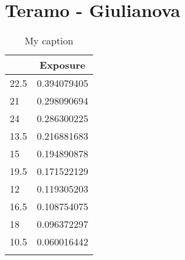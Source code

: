 \section{Teramo - Giulianova}
\begin{table}[H]
	\centering
	\caption{My caption}
	\label{my-label}
	\begin{tabular}{|l|l|}
		\hline
		\rowcolor[HTML]{C0C0C0} 
		\multicolumn{1}{|c|}{\cellcolor[HTML]{C0C0C0}\textbf{Km}} & \multicolumn{1}{c|}{\cellcolor[HTML]{C0C0C0}\textbf{Exposure}} \\ \hline
		\rowcolor[HTML]{F8FF00} 
		22.5                                                      & 0.394079405                                                    \\ \hline
		\rowcolor[HTML]{F8FF00} 
		21                                                        & 0.298090694                                                    \\ \hline
		\rowcolor[HTML]{F8FF00} 
		24                                                        & 0.286300225                                                    \\ \hline
		\rowcolor[HTML]{F8FF00} 
		13.5                                                      & 0.216881683                                                    \\ \hline
		\rowcolor[HTML]{009901} 
		15                                                        & 0.194890878                                                    \\ \hline
		\rowcolor[HTML]{009901} 
		19.5                                                      & 0.171522129                                                    \\ \hline
		\rowcolor[HTML]{009901} 
		12                                                        & 0.119305203                                                    \\ \hline
		\rowcolor[HTML]{009901} 
		16.5                                                      & 0.108754075                                                    \\ \hline
		\rowcolor[HTML]{009901} 
		18                                                        & 0.096372297                                                    \\ \hline
		\rowcolor[HTML]{009901} 
		10.5                                                      & 0.060016442                                                    \\ \hline
		\rowcolor[HTML]{009901} 

\end{tabular}
\end{table}
